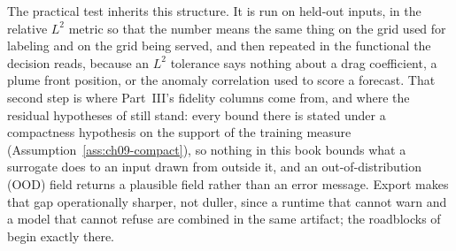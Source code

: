 The practical test inherits this structure. It is run on held-out inputs, in the
relative $L^{2}$ metric so that the number means the same thing on the grid used
for labeling and on the grid being served, and then repeated in the functional the
decision reads, because an $L^{2}$ tolerance says nothing about a drag coefficient,
a plume front position, or the anomaly correlation used to score a forecast. That
second step is where Part~III's fidelity columns come from, and where the residual
hypotheses of 
still stand: every bound there is stated under a compactness hypothesis on the
support of the training measure (Assumption~\ref{ass:ch09-compact}), so nothing in
this book bounds what a surrogate does to an input
drawn from outside it, and an out-of-distribution
(OOD) field returns a plausible field rather than an error message. Export makes that
gap operationally sharper, not duller, since a runtime that cannot warn and a
model that cannot refuse are combined in the same artifact; the roadblocks of
 begin exactly there.



